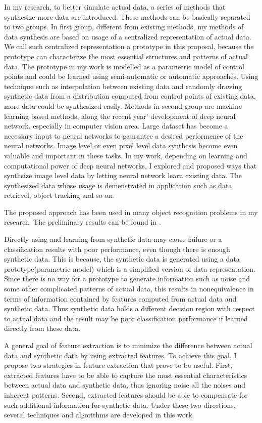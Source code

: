 \documentclass{iitthesis}
\begin{document}
In my research, to better simulate actual data, a series of methods that synthesize more data are introduced. These methods can be basically separated to two groups. In first group, different from existing methods, my methods of data synthesis are based on usage of a centralized representation of actual data. We call such centralized representation a prototype in this proposal, because the prototype can characterize the most essential structures and patterns of actual data. The prototype in my work is modelled as a parametric model of control points and could be learned using semi-automatic or automatic approaches. Using technique such as interpolation between existing data and randomly drawing synthetic data from a distribution computed from control points of existing data, more data could be synthesized easily. Methods in second group are machine learning based methods, along the recent year' development of deep neural network, especially in computer vision area. Large dataset has become a necessary input to neural networks to gaurantee a desired performence of the neural networks.  Image level or even pixel level data synthesis become even valuable and important in these tasks. In my work, depending on learning and computational power of deep neural networks, I explored and proposed ways that synthsize image level data by letting neural network learn existing data. The synthesized data whose usage is demenstrated in application such as data retrievel, object tracking and so on.

The proposed approach has been used in many object recognition problems in my research. The preliminary results can be found in \cite{Zhang2014Autoencoder}\cite{AndiZang2015}\cite{ZX:14}.

 Directly using and learning from synthetic data may cause failure or a classification results with poor performance, even though there is enough synthetic data. This is because, the synthetic data is generated using a data prototype(parametric model) which is a simplified version of data representation. Since there is no way for a prototype to generate information such as noise and some other complicated patterns of actual data, this results in nonequivalence in terms of information contained by features computed from actual data and synthetic data. Thus synthetic data holds a different decision region with respect to actual data and the result may be poor classification performance if learned directly from these data. 

A general goal of feature extraction is to minimize the difference between actual data and synthetic data by using extracted features. To achieve this goal, I propose two strategies in feature extraction that prove to be useful. First, extracted features have to be able to capture the most essential characteristics between actual data and synthetic data, thus ignoring noise all the noises and inherent patterns. Second, extracted features should be able to compensate for such additional information for synthetic data. Under these two directions, several techniques and algorithms are developed in this work.
\end{document}
